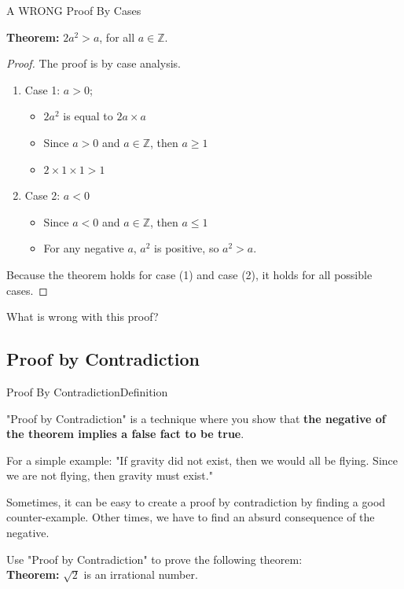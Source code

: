 \begin{frame}{A WRONG Proof By Cases}

  {\bf Theorem:} $2a^2 > a$, for all $a\in \mathbb{Z}$.

  \begin{proof}
    The proof is by case analysis.
  \begin{enumerate}
    \item Case 1: $a > 0$;
    \begin{itemize}
      \item $2a^2$ is equal to $2a\times a$
      \item Since $a > 0$ and $a \in \mathbb{Z}$, then $a \geq 1$
      \item $2\times 1\times 1 > 1$
    \end{itemize}
    \item Case 2: $a < 0$
    \begin{itemize}
      \item Since $a < 0$ and $a \in \mathbb{Z}$, then $a \leq 1$
      \item For any negative $a$, $a^2$ is positive, so $a^2 > a$.
    \end{itemize}
    \end{enumerate}
    Because the theorem holds for case (1) and case (2), it holds for all possible cases.
  \end{proof}
  \bigskip

  What is wrong with this proof?
\end{frame}

\subsection{Proof by Contradiction}
\begin{frame}{Proof By Contradiction}{Definition}

  "Proof by Contradiction" is a technique where you show that {\bf the negative of the theorem implies a false fact to be true}.\bigskip

  For a simple example: "If gravity did not exist, then we would all be flying. Since we are not flying, then gravity must exist."\bigskip

  Sometimes, it can be easy to create a proof by contradiction by finding a good counter-example. Other times, we have to find an absurd consequence of the negative.\bigskip

  Use "Proof by Contradiction" to prove the following theorem:\\
  {\bf Theorem:} $\sqrt{2}$ is an irrational number.
\end{frame}


